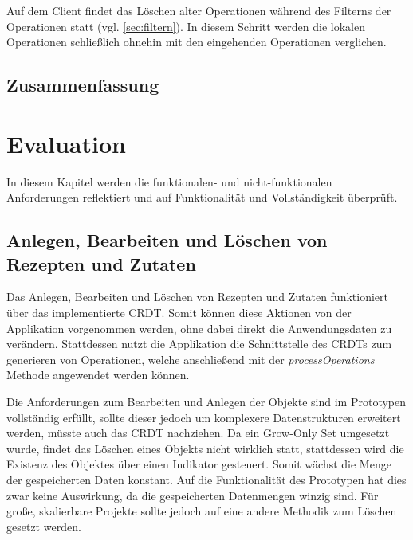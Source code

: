\documentclass[a4paper, 12pt]{scrreprt}
\begin{document}
Auf dem Client findet das Löschen alter Operationen während des Filterns der Operationen statt (vgl. \ref{sec:filtern}). In diesem Schritt werden die lokalen Operationen schließlich ohnehin mit den eingehenden Operationen verglichen. 

\begin{minipage}{\linewidth}
	
\end{minipage}

\section{Zusammenfassung}

\chapter{Evaluation}

In diesem Kapitel werden die funktionalen- und nicht-funktionalen Anforderungen reflektiert und auf Funktionalität und Vollständigkeit überprüft.

\section{Anlegen, Bearbeiten und Löschen von Rezepten und Zutaten}
Das Anlegen, Bearbeiten und Löschen von Rezepten und Zutaten funktioniert über das implementierte CRDT. Somit können diese Aktionen von der Applikation vorgenommen werden, ohne dabei direkt die Anwendungsdaten zu verändern. Stattdessen nutzt die Applikation die Schnittstelle des CRDTs zum generieren von Operationen, welche anschließend mit der \textit{processOperations} Methode angewendet werden können.

Die Anforderungen zum Bearbeiten und Anlegen der Objekte sind im Prototypen vollständig erfüllt, sollte dieser jedoch um komplexere Datenstrukturen erweitert werden, müsste auch das CRDT nachziehen. Da ein Grow-Only Set umgesetzt wurde, findet das Löschen eines Objekts nicht wirklich statt, stattdessen wird die Existenz des Objektes über einen Indikator gesteuert. Somit wächst die Menge der gespeicherten Daten konstant. Auf die Funktionalität des Prototypen hat dies zwar keine Auswirkung, da die gespeicherten Datenmengen winzig sind. Für große, skalierbare Projekte sollte jedoch auf eine andere Methodik zum Löschen gesetzt werden.
\end{document}
